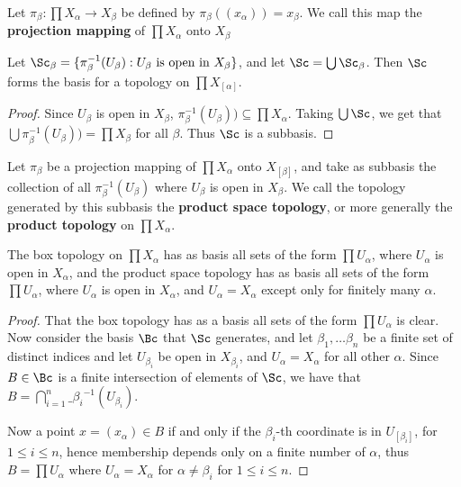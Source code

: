 \begin{definition}
    Let $\pi_{\beta}:\prod{X_{\alpha}} \rightarrow X_{\beta}$ be defined by
    $\pi_{\beta}((x_\alpha))=x_\beta$. We call this map the \textbf{projection mapping} of
    $\prod{X_{\alpha}}$ onto $X_{\beta}$		
\end{definition}

\begin{theorem}\label{2.1.2}
    Let $\Sc_{\beta}=\{\pi^{-1}_{\beta}(U_{\beta}):U_{\beta} \text{ is open in } X_{\beta}\}$, and let
    $\Sc=\bigcup{\Sc_{\beta}}$. Then $\Sc$ forms the basis for a topology on  $\prod{X_[\alpha]}$.
\end{theorem}
\begin{proof}
    Since $U_{\beta}$ is open in $X_{\beta}$, $\pi^{-1}_{\beta}(U_{\beta})) \subseteq
    \prod{X_\alpha}$. Taking $\bigcup{\Sc}$, we get that $\bigcup{\pi^{-1}_{\beta}(U_{\beta}))} =
    \prod{X}_{\beta}$ for all $\beta$. Thus  $\Sc$ is a subbasis.
\end{proof}


\begin{definition}
    Let $\pi_{\beta}$ be a projection mapping of $\prod{X_{\alpha}}$ onto $X_[\beta]$, and take as
    subbasis the collection of all $\pi^{-1}_{\beta}(U_{\beta})$ where $U_{\beta}$ is open in
    $X_{\beta}$. We call the topology generated by this subbasis the \textbf{product space
    topology}, or more generally the \textbf{product topology} on $\prod{X_{\alpha}}$.		
\end{definition}

\begin{theorem}\label{2.1.3}
    The box topology on $\prod{X_{\alpha}}$ has as basis all sets of the form $\prod{U_{\alpha}}$,
    where $U_{\alpha}$ is open in $X_{\alpha}$, and the product space topology has as basis all sets
    of the form $\prod{U_{\alpha}}$, where $U_{\alpha}$ is open in $X_{\alpha}$, and
    $U_{\alpha}=X_{\alpha}$ except only for finitely many $\alpha$.
\end{theorem}
\begin{proof}
    That the box topology has as a basis all sets of the form  $\prod{U_{\alpha}}$ is clear. Now 
    consider the basis $\Bc$ that  $\Sc$ generates, and let  $\beta_1, \dots \beta_n$ be a finite
    set of distinct indices and let $U_{\beta_i}$ be open in $X_{\beta_i}$, and
    $U_{\alpha}=X_{\alpha}$ for all other $\alpha$. Since  $B \in \Bc$ is a finite intersection of
    elements of  $\Sc$, we have that  $B=\bigcap_{i = 1}^{n}{\_{\beta_i}^{-1}(U_{\beta_i})}$.

    Now a point $x=(x_{\alpha}) \in B$ if and only if the $\beta_i$-th coordinate is in
    $U_[\beta_i]$, for $1 \leq i \leq n$, hence membership depends only on a finite number of
    $\alpha$, thus  $B=\prod{U_{\alpha}}$ where $U_{\alpha}=X_{\alpha}$ for $\alpha \neq \beta_i$
    for  $1 \leq i \leq n$.
\end{proof}

